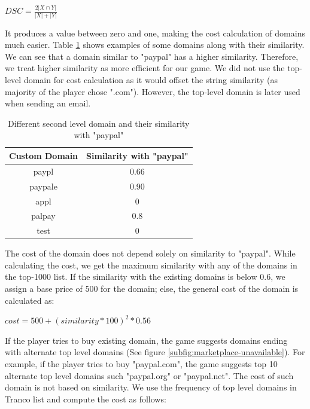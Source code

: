 \begin{center}
    \begin{math}
        DSC = \frac{2|X \cap Y|}{|X|+|Y|}
    \end{math}
\end{center}

It produces a value between zero and one, making the cost calculation of domains much easier. Table \ref{tab:dice} shows examples of some domains along with their similarity. We can see that a domain similar to "paypal" has a higher similarity. Therefore, we treat higher similarity as more efficient for our game. We did not use the top-level domain for cost calculation as it would offset the string similarity (as majority of the player chose ".com"). However, the top-level domain is later used when sending an email.

\begin{table}[h]
    \centering
    \begin{tabular}{c|c}
        \textbf{Custom Domain} & \textbf{Similarity with "paypal"} \\
        \hline
        paypl                  & 0.66                              \\
        paypale                & 0.90                              \\
        appl                   & 0                                 \\
        palpay                 & 0.8                               \\
        test                   & 0                                 \\
    \end{tabular}
    \caption{Different second level domain and their similarity with "paypal"}
    \label{tab:dice}
\end{table}

The cost of the domain does not depend solely on similarity to "paypal". While calculating the cost, we get the maximum similarity with any of the domains in the top-1000 list. If the similarity with the existing domains is below 0.6, we assign a base price of 500 for the domain; else, the general cost of the domain is calculated as:
\begin{center}
    \begin{math}
        cost = 500 + (similarity *100)^2 * 0.56
    \end{math}
\end{center}

If the player tries to buy existing domain, the game suggests domains ending with alternate top level domains (See figure \ref{subfig:marketplace-unavailable}). For example, if the player tries to buy "paypal.com", the game suggests top 10 alternate top level domains such "paypal.org" or "paypal.net". The cost of such domain is not based on similarity. We use the frequency of top level domains in Tranco list and compute the cost as follows:


